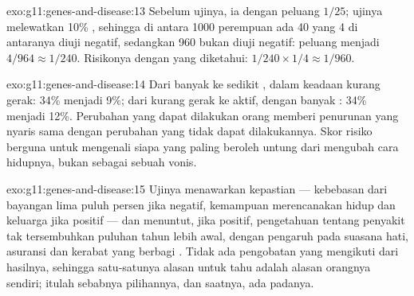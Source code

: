 \begin{solution}{exo:g11:genes-and-disease:13}
Sebelum ujinya, ia  dengan peluang $1/25$; ujinya melewatkan
10\% , sehingga di antara 1000 perempuan ada 40  yang
4 di antaranya diuji negatif, sedangkan 960 bukan  diuji
negatif: peluang menjadi  $4/964 \approx 1/240$. Risikonya
dengan  yang diketahui: $1/240 \times 1/4
\approx 1/960$.
\end{solution}

\begin{solution}{exo:g11:genes-and-disease:14}
Dari banyak ke sedikit , dalam keadaan kurang gerak: 34\% menjadi
9\%; dari kurang gerak ke aktif, dengan banyak : 34\% menjadi 12\%.
Perubahan yang dapat dilakukan orang memberi penurunan yang nyaris
sama dengan perubahan yang tidak dapat dilakukannya. Skor risiko
berguna untuk mengenali siapa yang paling beroleh untung dari mengubah
cara hidupnya, bukan sebagai sebuah vonis.
\end{solution}

\begin{solution}{exo:g11:genes-and-disease:15}
Ujinya menawarkan kepastian --- kebebasan dari bayangan lima puluh
persen jika negatif, kemampuan merencanakan hidup dan keluarga jika
positif --- dan menuntut, jika positif, pengetahuan tentang penyakit
tak tersembuhkan puluhan tahun lebih awal, dengan pengaruh pada suasana
hati, asuransi dan kerabat yang berbagi . Tidak ada pengobatan
yang mengikuti dari hasilnya, sehingga satu-satunya alasan untuk tahu
adalah alasan orangnya sendiri; itulah sebabnya pilihannya, dan
saatnya, ada padanya.
\end{solution}

